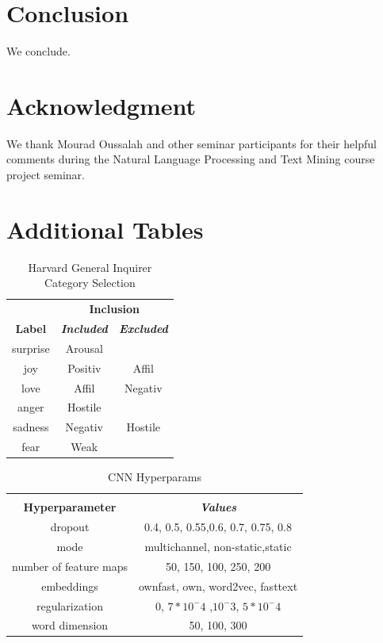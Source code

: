 \documentclass[conference]{IEEEtran}
\begin{document}
\section{Conclusion}
We conclude.

\section*{Acknowledgment}

We thank Mourad Oussalah and other seminar participants for their helpful comments during
 the Natural Language Processing and Text Mining course project seminar.




\appendices
\section{Additional Tables}
\label{FirstAppendix}

\begin{table}[htbp]
\caption{Harvard General Inquirer Category Selection}
\begin{center}
\begin{tabular}{|c|c|c|}
\hline
\textbf{}&\multicolumn{2}{|c|}{\textbf{Inclusion}} \\ 
\cline{2-3}
\textbf{Label} & \textbf{\textit{Included}}& \textbf{\textit{Excluded}} \\
\hline
surprise & Arousal & \\
\hline
joy & Positiv & Affil \\
\hline
love & Affil & Negativ\\
\hline
anger & Hostile & \\
\hline
sadness & Negativ & Hostile\\
\hline
fear & Weak & \\
\hline
\end{tabular}
\label{taba3}
\end{center}
\end{table}

\begin{table}[htbp]
\caption{CNN Hyperparams}
\begin{center}
\begin{tabular}{|c|c|}
\hline
\textbf{}&\multicolumn{1}{|c|}{\textbf{}} \\ 
\cline{2-2}
\textbf{Hyperparameter} & \textbf{\textit{Values}} \\ 
\hline
dropout & 0.4, 0.5, 0.55,0.6, 0.7,  0.75, 0.8\\ 
\hline
mode & multichannel, non-static,static \\ 
\hline
number of feature maps & 50, 150, 100, 250, 200 \\ 
\hline
embeddings & ownfast, own, word2vec, fasttext \\ 
\hline
regularization & 0, $7*10^-4$ ,$10^-3$, $5*10^-4$ \\ 
\hline
word dimension & 50, 100, 300 \\ 
\hline
\end{tabular}
\label{tabahp}
\end{center}
\end{table}
\end{document}
